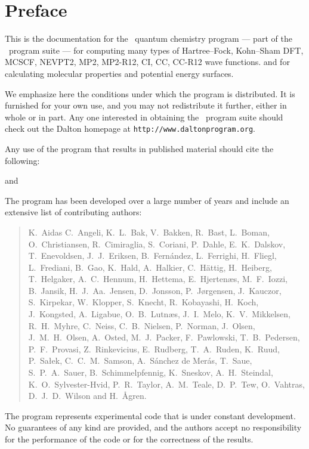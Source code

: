 \tableofcontents

\chapter*{Preface}

This is the documentation for the \dalton\ quantum chemistry program
--- part of the \latestrelease\ program suite ---
for computing many types of Hartree--Fock, Kohn--Sham DFT, 
MCSCF, NEVPT2, MP2, MP2-R12, CI, CC, CC-R12 wave functions.
and for calculating molecular properties and potential energy surfaces.

          We emphasize here the conditions under which the
program is distributed.  It is furnished for your own use,
and you may not redistribute it further, either in whole or in
part.  Any one interested in obtaining the \latestrelease\ program suite
should check out the Dalton homepage at \verb|http://www.daltonprogram.org|.

Any use of the program that results in published
material should cite the following:
\begin{quote}
\nocite{dalton}
\end{quote}
and
\begin{quote}
\nocite{daltonversion}
\end{quote}

The program has been developed over a large number of years and
include an extensive list of contributing authors:

\begin{quote}\raggedright
K.~Aidas
C.~Angeli,
K.~L.~Bak,
V.~Bakken,
R.~Bast,
L.~Boman,
O.~Christiansen,
R.~Cimiraglia,
S.~Coriani,
P.~Dahle,
E.~K.~Dalskov,
T.~Enevoldsen,
J.~J.~Eriksen,
B.~Fern\'{a}ndez,
L.~Ferrighi,
H.~Fliegl,
L.~Frediani,
B.~Gao,
K.~Hald,
A.~Halkier,
C.~H{\"a}ttig,
H.~Heiberg,
T.~Helgaker,
A.~C.~Hennum,
H.~Hettema,
E.~Hjerten\ae{}s,
M.~F.~Iozzi,
B.~Jansik,
H.~J.~Aa.~Jensen,
D.~Jonsson,
P.~J{\o}rgensen,
J.~Kauczor,
S.~Kirpekar,
W.~Klopper,
S.~Knecht,
R.~Kobayashi,
H.~Koch,
J.~Kongsted,
A.~Ligabue,
O.~B.~Lutn\ae{}s,
J.~I.~Melo,
K.~V.~Mikkelsen,
R.~H.~Myhre,
C.~Neiss,
C.~B.~Nielsen,
P.~Norman,
J.~Olsen,
J.~M.~H.~Olsen,
A.~Osted,
M.~J.~Packer,
F.~Pawlowski,
T.~B.~Pedersen,
P.~F.~Provasi,
Z.~Rinkevicius,
E.~Rudberg,
T.~A.~Ruden,
K.~Ruud,
P.~Sa\l{}ek,
C.~C.~M.~Samson,
A.~S\'{a}nchez de Mer\'{a}s,
T.~Saue,
S.~P.~A.~Sauer,
B.~Schimmelpfennig,
K.~Sneskov,
A.~H.~Steindal,
K.~O.~Sylvester-Hvid,
P.~R.~Taylor,
A.~M.~Teale,
D.~P.~Tew,
O.~Vahtras,
D.~J.~D.~Wilson
and H.~{\AA}gren.
\end{quote}

          The program represents experimental code that is
under constant development.  No guarantees of any kind are
provided, and the authors accept no responsibility for the
performance of the code or for the correctness of the results.
